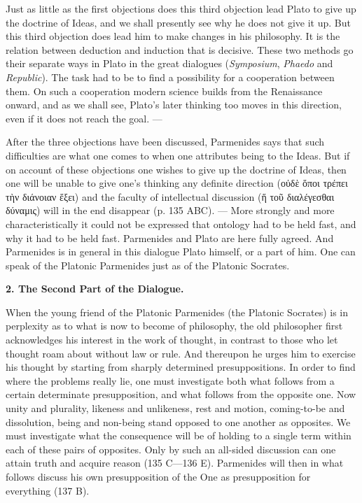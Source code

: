 \documentclass[12pt,a4paper,openany]{book}
\newcommand{\opage}[1]{\marginnote{\footnotesize\textit{[#1]}}}
\newcommand{\chaphead}[1]{\par\bigskip\phantomsection\begin{center}\bfseries #1\end{center}\medskip\ignorespaces}
\begin{document}
Just as little as the first objections does this
third objection lead Plato to give up the doctrine of Ideas, and we shall
presently see why he does not give it up.
But this third objection does lead him to make
changes in his philosophy. It is the relation between deduction
and induction that is decisive. These two methods
go their separate ways in Plato in the great dialogues (\textit{Symposium}, \textit{Phaedo}
and \textit{Republic}). The task had to be to find
a possibility for a cooperation between them. On such
a cooperation modern science builds from the
\setcounter{footnote}{0}%
\opage{26}Renaissance onward, and as we shall see, Plato’s
later thinking too moves in this direction, even if
it does not reach the goal. ---

After the three objections have been discussed, Parmenides says
that such difficulties are what one comes to when
one attributes being to the Ideas. But if on account
of these objections one wishes to give up the doctrine of Ideas, then one will
be unable to give one’s thinking any definite direction
(οὐδὲ ὅποι τρέπει τὴν διάνοιαν ἕξει) and the faculty of intellectual
discussion (ἥ τοῦ διαλέγεσθαι δύναμις) will in the end
disappear (p. 135 ABC). --- More strongly and more characteristically
it could not be expressed that ontology had to
be held fast, and why it had to be held fast. Parmenides
and Plato are here fully agreed. And Parmenides is in general
in this dialogue Plato himself, or a part of him. One
can speak of the Platonic Parmenides just as of the
Platonic Socrates.

\chaphead{2. The Second Part of the Dialogue.}


When the young friend of the Platonic Parmenides (the Platonic
Socrates) is in perplexity as to what is now to
become of philosophy, the old philosopher first acknowledges
his interest in the work of thought, in contrast to those who
let thought roam about without law or rule. And thereupon
he urges him to exercise his thought by starting from
sharply determined presuppositions. In order to find where the problems
really lie, one must investigate both what
follows from a certain determinate presupposition, and what
follows from the opposite one. Now unity and plurality, likeness
and unlikeness, rest and motion, coming-to-be and dissolution,
being and non-being stand opposed to one another as opposites.
We must investigate what the consequence will be of holding
\setcounter{footnote}{0}%
\opage{27}to a single term within each of these pairs of opposites.
Only by such an all-sided discussion can one attain
truth and acquire reason (135 C—136 E). Parmenides
will then in what follows discuss his own presupposition of
the One as presupposition for everything (137 B).
\end{document}
